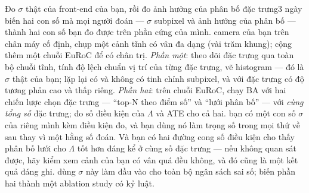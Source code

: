 \documentclass[../../vslam.tex]{subfiles}
\begin{document}
\begin{duan}{Đo \(\sigma\) thật của front-end của bạn, rồi đo ảnh hưởng của phân bố đặc trưng}{3 ngày}
\dmt biến hai con số mà mọi người đoán --- \(\sigma\) subpixel và ảnh hưởng của phân bố --- thành hai con số bạn đo được trên phần cứng của mình.
\ddl camera của bạn trên chân máy cố định, chụp một cảnh tĩnh có vân đa dạng (vài trăm khung); cộng thêm một chuỗi EuRoC để có chân trị.
\dbc \emph{Phần một}: theo dõi đặc trưng qua toàn bộ chuỗi tĩnh, tính độ lệch chuẩn vị trí của từng đặc trưng, vẽ histogram --- đó là \(\sigma\) thật của bạn; lặp lại có và không có tinh chỉnh subpixel, và với đặc trưng có độ tương phản cao và thấp riêng. \emph{Phần hai}: trên chuỗi EuRoC, chạy BA với hai chiến lược chọn đặc trưng --- ``top-N theo điểm số'' và ``lưới phân bố'' --- với \emph{cùng tổng số} đặc trưng; đo số điều kiện của \(\Lambda\) và ATE cho cả hai.
\dxk bạn có một con số \(\sigma\) của riêng mình kèm điều kiện đo, và bạn dùng nó làm trọng số trong mọi thứ về sau thay vì một hằng số đoán. Và bạn có hai đường cong số điều kiện cho thấy phân bố lưới cho \(\Lambda\) tốt hơn đáng kể ở cùng số đặc trưng --- nếu không quan sát được, hãy kiểm xem cảnh của bạn có vân quá đều không, và đó cũng là một kết quả đáng ghi.
\dnv {} dùng \(\sigma\) này làm đầu vào cho toàn bộ ngân sách sai số;  biến phần hai thành một ablation study có kỷ luật.
\end{duan}
\end{document}
